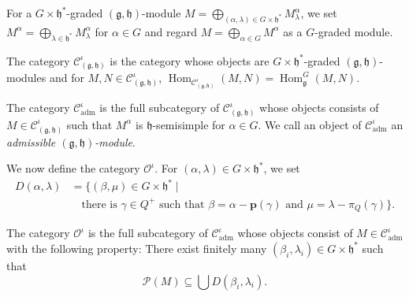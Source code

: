 \documentclass{beamer}
\DeclareMathOperator{\Hom}{Hom}
\DeclareMathOperator{\adm}{adm}
\begin{document}
\begin{frame}
  For a $G \times \mathfrak{h}^*$-graded $(\mathfrak{g}, \mathfrak{h})$-module $M = \bigoplus_{(\alpha, \lambda) \in G \times \mathfrak{h}^*}M^{\alpha}_{\lambda}$, we set $M^{\alpha} = \bigoplus_{\lambda \in \mathfrak{h}^*}M^{\alpha}_{\lambda}$ for $\alpha \in G$ and regard $M = \bigoplus_{\alpha \in G}M^{\alpha}$ as a $G$-graded module.

  The category $\mathcal{C}^{\iota}_{(\mathfrak{g}, \mathfrak{h})}$ is the category whose objects are $G \times \mathfrak{h}^*$-graded $(\mathfrak{g}, \mathfrak{h})$-modules and for $M, N \in \mathcal{C}^{\iota}_{(\mathfrak{g}, \mathfrak{h})}$, $\Hom_{\mathcal{C}^{\iota}_{(\mathfrak{g}, \mathfrak{h})}}(M, N) = \Hom^G_{\mathfrak{g}}(M, N)$.


  The category $\mathcal{C}^{\iota}_{\adm}$ is the full subcategory of $\mathcal{C}^{\iota}_{(\mathfrak{g}, \mathfrak{h})}$ whose objects consists of $M \in \mathcal{C}^{\iota}_{(\mathfrak{g}, \mathfrak{h})}$ such that $M^{\alpha}$ is $\mathfrak{h}$-semisimple for $\alpha \in G$.
  We call an object of $\mathcal{C}^{\iota}_{\adm}$ an \emph{admissible $(\mathfrak{g}, \mathfrak{h})$-module}.

  We now define the category $\mathcal{O}^{\iota}$.
  For $(\alpha, \lambda) \in G \times \mathfrak{h}^*$, we set
  \begin{align*}
    D(\alpha, \lambda) &= \{(\beta, \mu) \in G \times \mathfrak{h}^* \mid \\
                       &\quad \text{there is $\gamma \in Q^+$ such that $\beta = \alpha - \mathbf{p}(\gamma)$ and $\mu = \lambda - \pi_Q(\gamma)$}\}.
  \end{align*}

  The category $\mathcal{O}^{\iota}$ is the full subcategory of $\mathcal{C}^{\iota}_{\adm}$ whose objects consist of $M \in \mathcal{C}^{\iota}_{\adm}$ with the following property: There exist finitely many $(\beta_i, \lambda_i) \in G \times \mathfrak{h}^*$ such that
  \begin{equation*}
    \mathcal{P}(M) \subseteq \bigcup D(\beta_i, \lambda_i).
  \end{equation*}
\end{frame}
\end{document}
